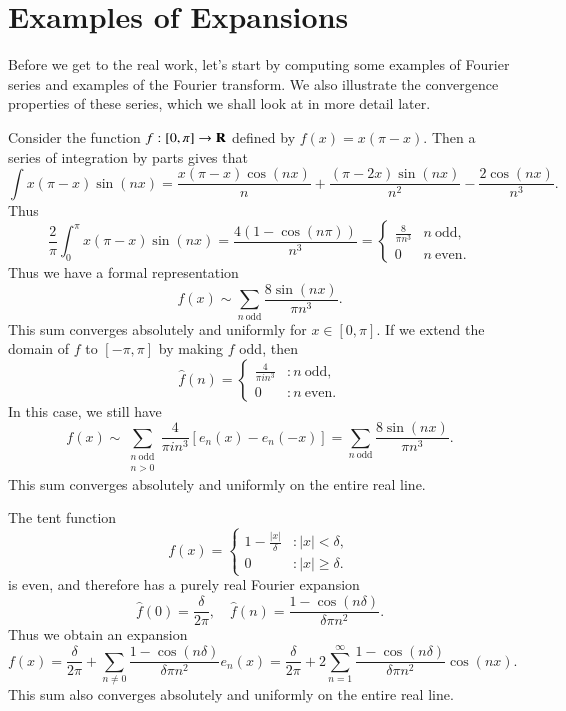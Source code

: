 \section{Examples of Expansions}

Before we get to the real work, let's start by computing some examples of Fourier series and examples of the Fourier transform. We also illustrate the convergence properties of these series, which we shall look at in more detail later.

\begin{example}
    Consider the function $f: [0,\pi] \to \operatorname{\mathbf{R}}$ defined by $f(x) = x(\pi - x)$. Then a series of integration by parts gives that
    \[ \int x(\pi - x) \sin(nx) = \frac{x(\pi - x) \cos(nx)}{n} + \frac{(\pi - 2x) \sin(nx)}{n^2} - \frac{2\cos(nx)}{n^3}. \]
    Thus
    \[ \frac{2}{\pi} \int_0^\pi x(\pi - x) \sin(nx) = \frac{4(1 - \cos(n\pi))}{n^3} = \begin{cases} \frac{8}{\pi n^3} & n\ \text{odd}, \\ 0 & n\ \text{even}. \end{cases}  \]
    Thus we have a formal representation
    \[ f(x) \sim \sum_{n\ \text{odd}} \frac{8 \sin(nx)}{\pi n^3}. \]
    This sum converges absolutely and uniformly for $x \in [0,\pi]$. If we extend the domain of $f$ to $[-\pi,\pi]$ by making $f$ odd, then
    \[ \widehat{f}(n) = \begin{cases} \frac{4}{\pi i n^3} & : n\ \text{odd}, \\ 0 & : n\ \text{even}. \end{cases} \]
    In this case, we still have
    \[ f(x) \sim \sum_{\substack{n\ \text{odd}\\ n > 0}} \frac{4}{\pi i n^3} [e_n(x) - e_n(-x)] = \sum_{n\ \text{odd}} \frac{8 \sin(nx)}{\pi n^3}. \]
    This sum converges absolutely and uniformly on the entire real line.
\end{example}

\begin{example}
    The tent function
    \[ f(x) = \begin{cases} 1 - \frac{|x|}{\delta} & : |x| < \delta, \\ 0 & : |x| \geq \delta. \end{cases} \]
    is even, and therefore has a purely real Fourier expansion
    \[ \widehat{f}(0) = \frac{\delta}{2\pi},\quad\widehat{f}(n) = \frac{1 - \cos(n\delta)}{\delta \pi n^2}. \]
    Thus we obtain an expansion
    \[ f(x) = \frac{\delta}{2\pi} + \sum_{n \neq 0} \frac{1 - \cos(n\delta)}{\delta \pi n^2} e_n(x) = \frac{\delta}{2 \pi} + 2 \sum_{n = 1}^\infty \frac{1 - \cos(n\delta)}{\delta \pi n^2} \cos(nx). \]
    This sum also converges absolutely and uniformly on the entire real line.
\end{example}

